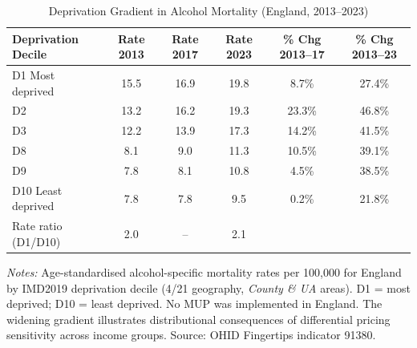\begin{table}[htbp]
\centering
\caption{Deprivation Gradient in Alcohol Mortality (England, 2013--2023)}
\label{tab:deprivation}
\small
\begin{tabular}{lccccc}
\toprule
Deprivation Decile & Rate 2013 & Rate 2017 & Rate 2023 & \% Chg 2013--17 & \% Chg 2013--23 \\
\midrule
D1 Most deprived & 15.5 & 16.9 & 19.8 & 8.7\% & 27.4\% \\
D2 & 13.2 & 16.2 & 19.3 & 23.3\% & 46.8\% \\
\midrule
D3 & 12.2 & 13.9 & 17.3 & 14.2\% & 41.5\% \\
D8 & 8.1 & 9.0 & 11.3 & 10.5\% & 39.1\% \\
D9 & 7.8 & 8.1 & 10.8 & 4.5\% & 38.5\% \\
D10 Least deprived & 7.8 & 7.8 & 9.5 & 0.2\% & 21.8\% \\
\midrule
Rate ratio (D1/D10) & 2.0 & -- & 2.1 & & \\
\bottomrule
\end{tabular}
\begin{tablenotes}
\small
\item \textit{Notes:} Age-standardised alcohol-specific mortality rates per 100,000 for 
England by IMD2019 deprivation decile (4/21 geography, \textit{County \& UA} areas). 
D1 = most deprived; D10 = least deprived. 
No MUP was implemented in England. The widening gradient illustrates distributional 
consequences of differential pricing sensitivity across income groups. 
Source: OHID Fingertips indicator 91380.
\end{tablenotes}
\end{table}
